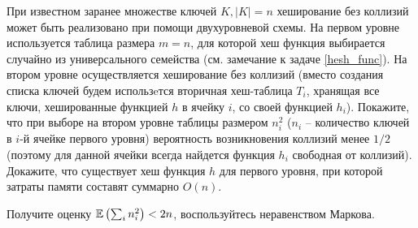 \begin{problem}
При известном заранее множестве ключей $K, |K| = n$ хеширование без коллизий может быть реализовано при помощи двухуровневой схемы. На первом уровне используется таблица размера $m = n$, для которой хеш функция выбирается случайно из универсального семейства (см. замечание к задаче \ref{hesh_func}). На втором уровне осуществляется хеширование без коллизий (вместо создания списка ключей будем использeтся вторичная хеш-таблица $T_i$, хранящая все ключи, хешированные функцией $h$ в ячейку $i$, со своей функцией $h_i$).  Покажите, что при выборе  на втором уровне таблицы размером $n_i^2$ ($n_i$ -- количество ключей в $i$-й ячейке первого уровня) вероятность возникновения коллизий менее $1/2$ (поэтому для данной ячейки всегда найдется функция $h_i$ свободная от коллизий). Докажите, что существует хеш функция $h$ для первого уровня, при которой затраты памяти составят суммарно $O(n)$.    
\end{problem}

\begin{ordre}
Получите оценку $\mathrm{{\mathbb E}} \left(\sum_i n_i^2\right) < 2n$, воспользуйтесь неравенством Маркова.
\end{ordre}


